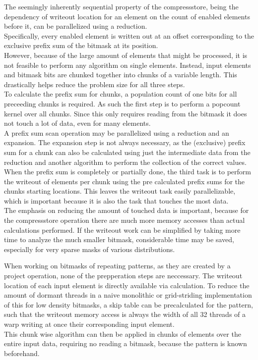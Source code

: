 \documentclass{tudscrreprt}
\begin{document}
		The seemingly inherently sequential property of the compressstore, being the dependency of writeout location for an element on the count of enabled elements before it, can be parallelized using a reduction. \\
		Specifically, every enabled element is written out at an offset corresponding to the exclusive prefix sum of the bitmask at its position. \\
		
		However, because of the large amount of elements that might be processed, it is not feasible to perform any algorithm on single elements. Instead, input elements and bitmask bits are chunked together into chunks of a variable length. This drastically helps reduce the problem size for all three steps. \\
		
		To calculate the prefix sum for chunks, a population count of one bits for all preceeding chunks is required. As such the first step is to perform a popcount kernel over all chunks. Since this only requires reading from the bitmask it does not touch a lot of data, even for many elements. \\
		
		A prefix sum scan operation may be parallelized using a reduction and an expansion. The expansion step is not always necessary, as the (exclusive) prefix sum for a chunk can also be calculated using just the intermediate data from the reduction and another algorithm to perform the collection of the correct values. \\
		
		When the prefix sum is completely or partially done, the third task is to perform the writeout of elements per chunk using the pre calculated prefix sums for the chunks starting locations. This leaves the writeout task easily parallelizable, which is important because it is also the task that touches the most data. \\
		
		The emphasis on reducing the amount of touched data is important, because for the compressstore operation there are much more memory accesses than actual calculations performed. If the writeout work can be simplified by taking more time to analyze the much smaller bitmask, considerable time may be saved, especially for very sparse masks of various distributions.
	
		When working on bitmasks of repeating patterns, as they are created by a project operation, none of the prepperation steps are neccessary. The writeout location of each input element is directly available via calculation. To reduce the amount of dormant threads in a naive monolithic or grid-striding \cite{cuda_gridstriding} implementation of this for low density bitmasks, a skip table can be precalculated for the pattern, such that the writeout memory access is always the width of all 32 threads of a warp writing at once their corresponding input element. \\
		This chunk wise algorithm can then be applied in chunks of elements over the entire input data, requiring no reading a bitmask, because the pattern is known beforehand. \\
	
\end{document}
